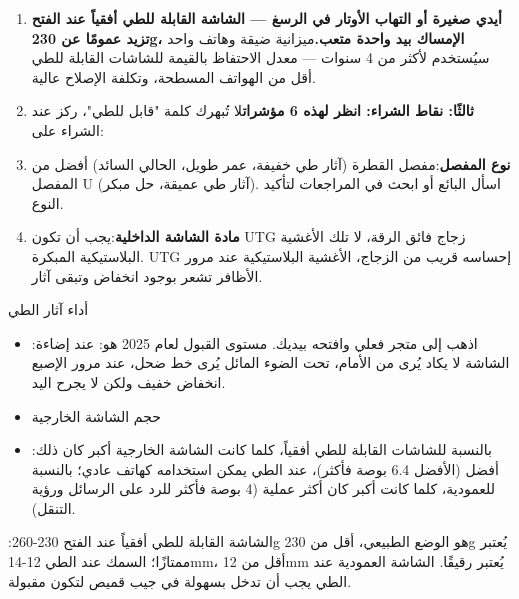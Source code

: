\begin{enumerate}
  \item \textbf{أيدي صغيرة أو التهاب الأوتار في الرسغ — الشاشة القابلة للطي أفقياً عند الفتح تزيد عمومًا عن 230g، الإمساك بيد واحدة متعب.}ميزانية ضيقة وهاتف واحد سيُستخدم لأكثر من 4 سنوات — معدل الاحتفاظ بالقيمة للشاشات القابلة للطي أقل من الهواتف المسطحة، وتكلفة الإصلاح عالية.
  \item \textbf{ثالثًا: نقاط الشراء: انظر لهذه 6 مؤشرات}لا تُبهرك كلمة "قابل للطي"، ركز عند الشراء على:
  \item \textbf{نوع المفصل}:مفصل القطرة (آثار طي خفيفة، عمر طويل، الحالي السائد) أفضل من المفصل U (آثار طي عميقة، حل مبكر). اسأل البائع أو ابحث في المراجعات لتأكيد النوع.
  \item \textbf{مادة الشاشة الداخلية}:يجب أن تكون UTG زجاج فائق الرقة، لا تلك الأغشية البلاستيكية المبكرة. UTG إحساسه قريب من الزجاج، الأغشية البلاستيكية عند مرور الأظافر تشعر بوجود انخفاض وتبقى آثار.
\end{enumerate}

\begin{tcbwarn}{أداء آثار الطي}
\begin{itemize}
  \item :اذهب إلى متجر فعلي وافتحه بيديك. مستوى القبول لعام 2025 هو: عند إضاءة الشاشة لا يكاد يُرى من الأمام، تحت الضوء المائل يُرى خط ضحل، عند مرور الإصبع انخفاض خفيف ولكن لا يجرح اليد.
  \item حجم الشاشة الخارجية
  \item :بالنسبة للشاشات القابلة للطي أفقياً، كلما كانت الشاشة الخارجية أكبر كان ذلك أفضل (الأفضل 6.4 بوصة فأكثر)، عند الطي يمكن استخدامه كهاتف عادي؛ بالنسبة للعمودية، كلما كانت أكبر كان أكثر عملية (4 بوصة فأكثر للرد على الرسائل ورؤية التنقل).
\end{itemize}

\end{tcbwarn}


:الشاشة القابلة للطي أفقياً عند الفتح 230-260g هو الوضع الطبيعي، أقل من 230g يُعتبر ممتازًا؛ السمك عند الطي 12-14mm، أقل من 12mm يُعتبر رقيقًا. الشاشة العمودية عند الطي يجب أن تدخل بسهولة في جيب قميص لتكون مقبولة.

